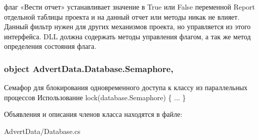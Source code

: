 флаг «Вести отчет» устанавливает значение в True или False переменной Report отдельной таблицы проекта и на данный отчет или методы никак не влияет. Данный фильтр нужен для других механизмов проекта, но управляется из этого интерфейса. D\+L\+L должна содержать методы управления флагом, а так же метод определения состояния флага. 

\hypertarget{class_advert_data_1_1_database_a4ff9641ffa4a8b7431228d126703928c}{
\subsubsection[{Semaphore}]{\setlength{\rightskip}{0pt plus 5cm}object Advert\+Data.\+Database.\+Semaphore\hspace{0.3cm}{\ttfamily [get]}, {\ttfamily [set]}}}\label{class_advert_data_1_1_database_a4ff9641ffa4a8b7431228d126703928c}


Семафор для блокирования одновременного доступа к классу из параллельных процессов Использование lock(database.\+Semaphore) \{ ... \} 



Объявления и описания членов класса находятся в файле\+:\begin{DoxyCompactItemize}
\item 
Advert\+Data/Database.\+cs\end{DoxyCompactItemize}
